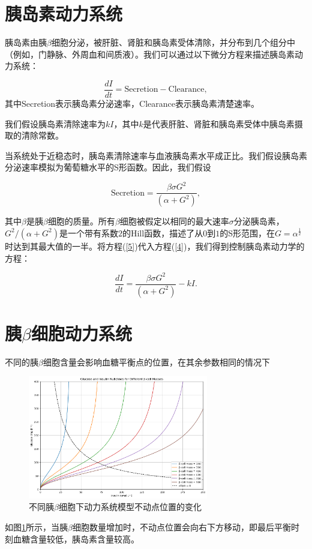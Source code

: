 \section{胰岛素动力系统}
胰岛素由胰$\beta$细胞分泌，被肝脏、肾脏和胰岛素受体清除，并分布到几个组分中（例如，门静脉、外周血和间质液）。我们可以通过以下微分方程来描述胰岛素动力系统：

\begin{equation}\label{4}
    \frac{dI}{dt} = \text{Secretion} - \text{Clearance},
\end{equation}
其中Secretion表示胰岛素分泌速率，Clearance表示胰岛素清楚速率。

我们假设胰岛素清除速率为\(kI\)，其中$k$是代表肝脏、肾脏和胰岛素受体中胰岛素摄取的清除常数。

当系统处于近稳态时，胰岛素清除速率与血液胰岛素水平成正比。我们假设胰岛素分泌速率模拟为葡萄糖水平的S形函数\cite{topp2000model}。因此，我们假设

\begin{equation}\label{5}
    \text{Secretion} = \frac{\beta\sigma G^2}{(\alpha + G^2)},
\end{equation}

其中$\beta$是胰$\beta$细胞的质量。所有$\beta$细胞被假定以相同的最大速率$\sigma$分泌胰岛素，\(G^2/(\alpha + G^2)\)是一个带有系数$2$的Hill函数，描述了从$0$到$1$的S形范围，在$G=\alpha^{\frac{1}{2}}$时达到其最大值的一半。将方程(\ref{5})代入方程(\ref{4})，我们得到控制胰岛素动力学的方程：

\begin{equation}
    \frac{dI}{dt} = \frac{\beta\sigma G^2}{(\alpha + G^2)} - kI.
\end{equation}

\section{胰\(\beta\)细胞动力系统}
不同的胰$\beta$细胞含量会影响血糖平衡点的位置，在其余参数相同的情况下
\begin{figure}[H]
    \centering
    \includegraphics[width=0.7\textwidth]{Img/nullcline.png}
    \caption{不同胰\(\beta\)细胞下动力系统模型不动点位置的变化}
    \label{fig:nullcline}
\end{figure}
如图\ref{fig:nullcline}所示，当胰$\beta$细胞数量增加时，不动点位置会向右下方移动，即最后平衡时刻血糖含量较低，胰岛素含量较高。

